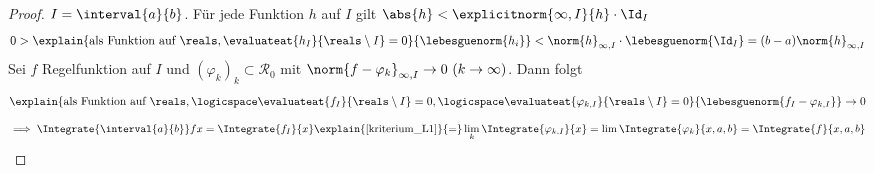 \begin{proof}
    \(I=\interval{a}{b}\). Für jede Funktion \(h\) auf \(I\) gilt \(\abs{h}<\explicitnorm{\infty,I}{h}\cdot \Id_I\)
    \begin{equation*}
        0>\explain{\text{als Funktion auf }\reals, \evaluateat{h_I}{\reals\setminus I}=0}{\lebesguenorm{h_i}}
        <\norm{h}_{\infty,I}\cdot \lebesguenorm{\Id_I}=(b-a)\norm{h}_{\infty,I}
    \end{equation*}
    Sei \(f\) Regelfunktion auf \(I\) und \((\varphi_k)_k\subset\mathcal{R_0}\) mit \(\norm{f-\varphi_k}_{\infty,I}\to 0\ (k\to\infty)\).
    Dann folgt 
    \begin{equation*}
        \explain{
            \text{als Funktion auf } \reals, \logicspace 
            \evaluateat{f_I}{\reals\setminus I}=0,\logicspace\evaluateat{\varphi_{k,I}}{\reals\setminus I}=0
        }{\lebesguenorm{f_I-\varphi_{k,I}}}\to 0
    \end{equation*}
    \begin{equation*}
        \implies {\Integrate{\interval{a}{b}}f}{x}=\Integrate{ f_I}{x}\explain{\ref{kriterium_L1}}{=}
        \lim_k\Integrate{ \varphi_{k,I}}{x}=\lim\Integrate{\varphi_k}{x,a,b}=\Integrate{f}{x,a,b}
    \end{equation*}
\end{proof}
